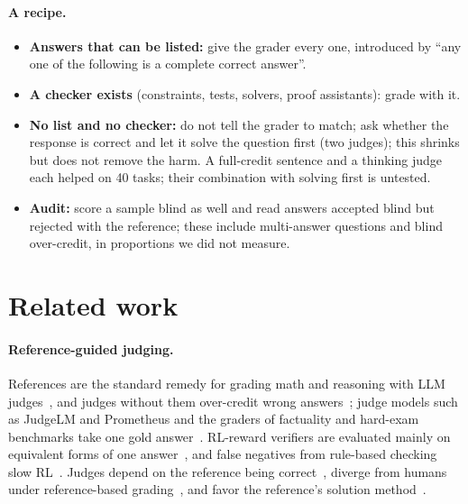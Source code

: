 \documentclass{article}
\begin{document}
\paragraph{A recipe.}
\begin{itemize}[leftmargin=1.2em,itemsep=1pt,topsep=2pt]
\item \textbf{Answers that can be listed:} give the grader every one, introduced by ``any one of the following is a complete correct answer''.
\item \textbf{A checker exists} (constraints, tests, solvers, proof assistants): grade with it.
\item \textbf{No list and no checker:} do not tell the grader to match; ask whether the response is correct and let it solve the question first (two judges); this shrinks but does not remove the harm. A full-credit sentence and a thinking judge each helped on 40 tasks; their combination with solving first is untested.
\item \textbf{Audit:} score a sample blind as well and read answers accepted blind but rejected with the reference; these include multi-answer questions and blind over-credit, in proportions we did not measure.
\end{itemize}

\section{Related work}
\label{sec:related}

\paragraph{Reference-guided judging.}
References are the standard remedy for grading math and reasoning with LLM judges~\citep{zheng2023judging,refguided2024,chen2026rethinking}, and judges without them over-credit wrong answers~\citep{generous2026}; judge models such as JudgeLM and Prometheus and the graders of factuality and hard-exam benchmarks take one gold answer~\citep{zhu2023judgelm,kim2024prometheus,wei2024simpleqa,wei2025browsecomp,phan2025hle}. RL-reward verifiers are evaluated mainly on equivalent forms of one answer~\citep{chen2025xverify,liu2025compassverifier}, and false negatives from rule-based checking slow RL~\citep{xu2025tinyv,huang2025pitfalls}.
Judges depend on the reference being correct~\citep{judgingref2026,krumdick2025nofreelabels}, diverge from humans under reference-based grading~\citep{thakur2024judging}, and favor the reference's solution method~\citep{fixation2025}.
\end{document}
